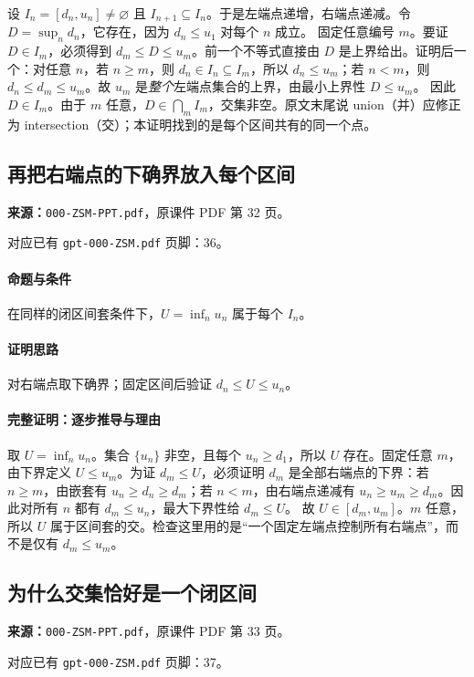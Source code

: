 设 $I_n=[d_n,u_n]\ne\varnothing$ 且 $I_{n+1}\subseteq I_n$。于是左端点递增，右端点递减。令 $D=\sup_n d_n$，它存在，因为 $d_n\le u_1$ 对每个 $n$ 成立。
固定任意编号 $m$。要证 $D\in I_m$，必须得到 $d_m\le D\le u_m$。前一个不等式直接由 $D$ 是上界给出。证明后一个：对任意 $n$，若 $n\ge m$，则 $d_n\in I_n\subseteq I_m$，所以 $d_n\le u_m$；若 $n<m$，则 $d_n\le d_m\le u_m$。故 $u_m$ 是\emph{整个}左端点集合的上界，由最小上界性 $D\le u_m$。
因此 $D\in I_m$。由于 $m$ 任意，$D\in\bigcap_m I_m$，交集非空。原文末尾说 union（并）应修正为 intersection（交）；本证明找到的是每个区间共有的同一个点。

\clearpage\subsection{再把右端点的下确界放入每个区间}
\textbf{来源：}\texttt{000-ZSM-PPT.pdf}，原课件 PDF 第 32 页。\par
对应已有 \texttt{gpt-000-ZSM.pdf} 页脚：36。\par
\paragraph{命题与条件}在同样的闭区间套条件下，$U=\inf_n u_n$ 属于每个 $I_n$。
\paragraph{证明思路}对右端点取下确界；固定区间后验证 $d_n\le U\le u_n$。
\paragraph{完整证明：逐步推导与理由}

取 $U=\inf_n u_n$。集合 $\{u_n\}$ 非空，且每个 $u_n\ge d_1$，所以 $U$ 存在。固定任意 $m$，由下界定义 $U\le u_m$。为证 $d_m\le U$，必须证明 $d_m$ 是全部右端点的下界：若 $n\ge m$，由嵌套有 $u_n\ge d_n\ge d_m$；若 $n<m$，由右端点递减有 $u_n\ge u_m\ge d_m$。因此对所有 $n$ 都有 $d_m\le u_n$，最大下界性给 $d_m\le U$。
故 $U\in[d_m,u_m]$。$m$ 任意，所以 $U$ 属于区间套的交。检查这里用的是“一个固定左端点控制所有右端点”，而不是仅有 $d_m\le u_m$。

\clearpage\subsection{为什么交集恰好是一个闭区间}
\textbf{来源：}\texttt{000-ZSM-PPT.pdf}，原课件 PDF 第 33 页。\par
对应已有 \texttt{gpt-000-ZSM.pdf} 页脚：37。\par
